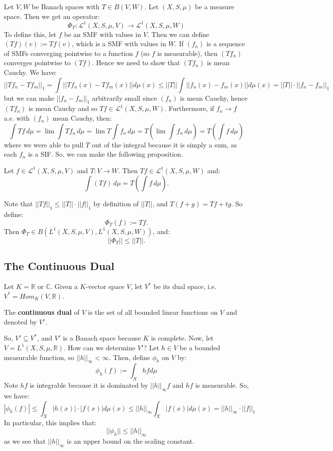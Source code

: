	Let $V, W$ be Banach spaces with $T\in B(V, W)$. Let $(X, S, \mu)$ be a measure space. Then we get an operator:
	$$
		\Phi_T : \mathcal L^1(X, S, \mu, V)\rightarrow\mathcal L^1(X, S, \mu, W)
	$$
	To define this, let $f$ be an SMF with values in $V$. Then we can define $(Tf)(v) := Tf(v)$, which is a SMF with values 
	in $W$. If $(f_n)$ is a sequence of SMFs converging pointwise to a function $f$ (so $f$ is measurable), then $(Tf_n)$ 
	converges pointwise to $(Tf)$. Hence we need to show that $(Tf_n)$ is mean Cauchy. We have:
	$$
		||Tf_n - Tf_m||_1 = \int ||Tf_n(x) - Tf_m(x)||d\mu(x)\leq ||T||\int ||f_n(x) - f_m(x)||d\mu(x) = ||T||\cdot ||f_n - f_m||_1
	$$
	but we can make $||f_n - f_m||_1$ arbitrarily small since $(f_n)$ is mean Cauchy, hence $(Tf_n)$ is mean Cauchy and 
	so $Tf\in\mathcal L^1(X, S, \mu, W)$. Furthermore, if $f_n\rightarrow f$ a.e. with $(f_n)$ mean Cauchy, then:
	$$
		\int Tf \, d\mu = \lim\int Tf_n\, d\mu = \lim T\int f_n\, d\mu = T(\lim\int f_n \,d\mu) = T(\int f\, d\mu)
	$$
	where we were able to pull $T$ out of the integral because it is simply a sum, as each $f_n$ is a SIF. So, we can 
	make the following proposition.
	
	\begin{prop}
		Let $f\in\mathcal L^1(X, S, \mu, V)$ and $T : V\rightarrow W$. Then $Tf\in\mathcal L^1(X, S, \mu, W)$ and:
		$$
			\int(Tf) \,d\mu = T\left(\int f\, d\mu \right).
		$$
	\end{prop}
	Note that $||Tf||_1\leq ||T||\cdot ||f||_1$ by definition of $||T||$, and $T(f + g) = Tf + tg$. So define:
	$$
		\Phi_T(f) := Tf.
	$$
	Then $\Phi_T\in B(L^1(X, S, \mu, V), L^1(X, S, \mu, W))$, and:
	$$
		||\Phi_T||\leq ||T||.
	$$
	
	\subsection{The Continuous Dual}
	
	Let $K = \mathbb R$ or $\mathbb C$. Given a $K$-vector space $V$, let $V^*$ be its dual space, i.e. $V^* = Hom_K(V, 
	\mathbb R)$.
	
	\begin{definition}
		The \textbf{continuous dual} of $V$ is the set of all bounded linear functions on $V$ and denoted by $V'$. 
	\end{definition}
	
	So, $V'\subseteq V^*$, and $V'$ is a Banach space because $K$ is complete. Now, let $V = L^1(X, S, \mu, \mathbb R)$. 
	How can we determine $V'$? Let $h\in V$ be a bounded measurable function, so $||h||_\infty < \infty$. Then, define 
	$\phi_h$ on $V$ by:
	$$
		\phi_h(f) := \int_X hfd\mu
	$$
	Note $hf$ is integrable because it is dominated by $||h||_\infty f$ and $hf$ is measurable. So, we have:
	$$
		|\phi_h(f)|\leq\int_X|h(x)|\cdot|f(x)|d\mu(x)\leq ||h||_\infty\int_X|f(x)|d\mu(x) = ||h||_\infty\cdot||f||_1
	$$
	In particular, this implies that:
	$$
		||\phi_h||\leq ||h||_\infty
	$$
	as we see that $||h||_\infty$ is an upper bound on the scaling constant.
	
